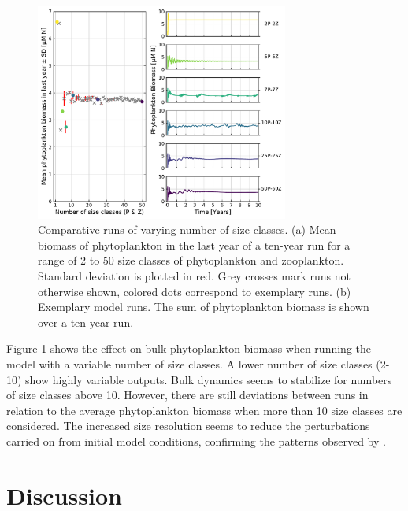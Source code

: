 \documentclass[journal abbreviation, manuscript]{copernicus}
\begin{document}
\begin{figure}[t]
\includegraphics[width=8.3cm]{Figures/firstdraft_plots/03_ASTroCAT_sizeclassrange.pdf}
\caption{Comparative runs of varying number of size-classes. (a) Mean biomass of phytoplankton in the last year of a ten-year run for a range of 2 to 50 size classes of phytoplankton and zooplankton. Standard deviation is plotted in red. Grey crosses mark runs not otherwise shown, colored dots correspond to exemplary runs. (b) Exemplary model runs. The sum of phytoplankton biomass is shown over a ten-year run.}
\label{Figure:ResultsASTroCAT_2}
\end{figure}

Figure \ref{Figure:ResultsASTroCAT_2} shows the effect on bulk phytoplankton biomass when running the model with a variable number of size classes. A lower number of size classes (2-10) show highly variable outputs. Bulk dynamics seems to stabilize for numbers of size classes above 10. However, there are still deviations between runs in relation to the average phytoplankton biomass when more than 10 size classes are considered. The increased size resolution seems to reduce the perturbations carried on from initial model conditions, confirming the patterns observed by \citet{Baird2010IncreasingErrors}.


\section{Discussion}

\end{document}
